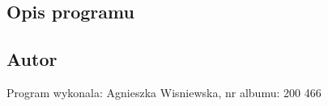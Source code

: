 \hypertarget{index_description}{}\subsection{Opis programu}\label{index_description}
\hypertarget{index_author}{}\subsection{Autor}\label{index_author}
Program wykonala\-: Agnieszka Wisniewska, nr albumu\-: 200 466 